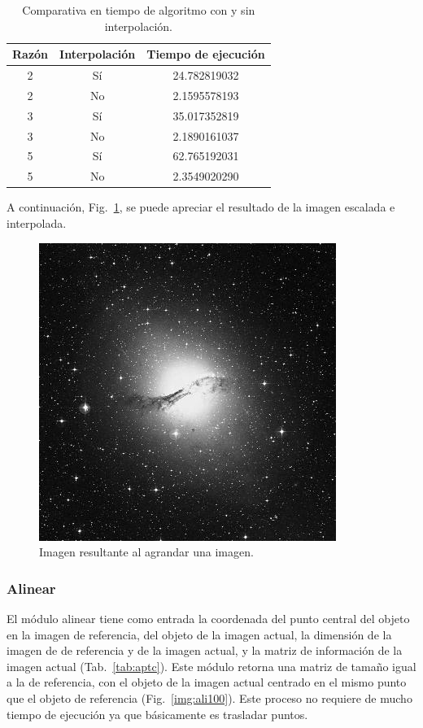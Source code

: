 \begin{table}[ht!]
	\centering
	\begin{tabular}{c|c|c}
		Razón & Interpolación & Tiempo de ejecución \\\hline\hline
		2 & Sí & 24.782819032 \\\hline
		2 & No & 2.1595578193 \\\hline
		3 & Sí & 35.017352819 \\\hline
		3 & No & 2.1890161037 \\\hline
		5 & Sí & 62.765192031 \\\hline
		5 & No & 2.3549020290 \\
	\end{tabular}
	\caption{Comparativa en tiempo de algoritmo con y sin interpolación.}
	\label{tab:ctcsi}
\end{table}

A continuación, Fig.~\ref{img:irai}, se puede apreciar el resultado de la imagen escalada e interpolada.

\begin{figure}[ht!]
	\centering
	\includegraphics[scale=.5]{img/irai}
	\caption{Imagen resultante al agrandar una imagen.}
	\label{img:irai}
\end{figure}

\subsubsection{Alinear}

El módulo alinear tiene como entrada la coordenada del punto central del objeto en la imagen de referencia, del objeto de la imagen actual, la dimensión de la imagen de de referencia y de la imagen actual, y la matriz de información de la imagen actual (Tab.~\ref{tab:aptc}). Este módulo retorna una matriz de tamaño igual a la de referencia, con el objeto de la imagen actual centrado en el mismo punto que el objeto de referencia (Fig.~\ref{img:ali100}). Este proceso no requiere de mucho tiempo de ejecución ya que básicamente es trasladar puntos.

